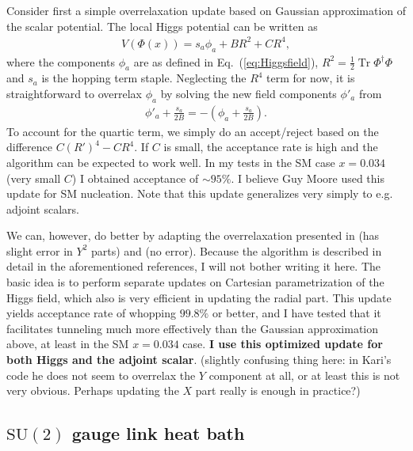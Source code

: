 \documentclass[11pt,a4paper]{article}
\newcommand\Tr{\operatorname{Tr}}
\newcommand\gr[1]{\mathrm{#1}}%
\newcommand\lauri[1]{{\color{myorange}#1}}
\begin{document}
Consider first a simple overrelaxation update based on Gaussian approximation of the scalar potential. The local Higgs potential can be written as 
\begin{align}
V(\Phi(x)) = s_a \phi_a + B R^2 + C R^4,
\end{align}
where the components $\phi_a$ are as defined in Eq.~(\ref{eq:Higgsfield}), $R^2 = \frac12 \Tr\Phi^\dagger\Phi$ and $s_a$ is the hopping term staple. Neglecting the $R^4$ term for now, it is straightforward to overrelax $\phi_a$ by solving the new field components $\phi'_a$ from
\begin{align}
\phi'_a + \frac{s_a}{2B} = -(\phi_a + \frac{s_a}{2B}).
\end{align}
To account for the quartic term, we simply do an accept/reject based on the difference $C (R')^4 - C R^4$. If $C$ is small, the acceptance rate is high and the algorithm can be expected to work well. In my tests in the SM case $x=0.034$ (very small $C$) I obtained acceptance of $\sim 95\%$. \lauri{I believe Guy Moore used this update for SM nucleation.} Note that this update generalizes very simply to e.g. adjoint scalars.

We can, however, do better by adapting the overrelaxation presented in \cite{Kajantie:1995kf} (has slight error in $Y^2$ parts) and \cite{Laine:1998qk} (no error). Because the algorithm is described in detail in the aforementioned references, I will not bother writing it here. The basic idea is to perform separate updates on Cartesian parametrization of the Higgs field, which also is very efficient in updating the radial part. This update yields acceptance rate of whopping $99.8\%$ or better, and I have tested that it facilitates tunneling much more effectively than the Gaussian approximation above, at least in the SM $x = 0.034$ case. \textbf{I use this optimized update for both Higgs and the adjoint scalar}. \lauri{(slightly confusing thing here: in Kari's code he does not seem to overrelax the $Y$ component at all, or at least this is not very obvious. Perhaps updating the $X$ part really is enough in practice?)}

\subsection{$\gr{SU(2)}$ gauge link heat bath}
\end{document}
